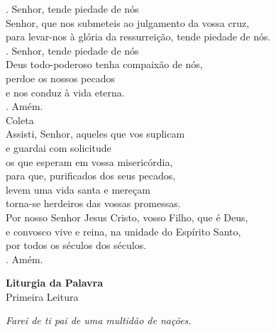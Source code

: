 \documentclass{book}
\begin{document}
\begin{flushleft}
    {\color{VioletRed2} \Rbar.} Senhor, tende piedade de nós
    \vspace{.2cm} \\
    Senhor, que nos submeteis ao julgamento da vossa cruz, \\
    para levar-nos à glória da ressurreição,
    tende piedade de nós. \\
    {\color{VioletRed2} \Rbar.} Senhor, tende piedade de nós
    \vspace{.2cm} \\
    Deus todo-poderoso tenha compaixão de nós, \\
    perdoe os nossos pecados \\
    e nos conduz à vida eterna. \\
    {\color{VioletRed2} \Rbar.} Amém.
    \vspace{.2cm} \\
    \textcolor{VioletRed2}{Coleta}
    \vspace{.2cm} \\
    Assisti, Senhor, aqueles que vos suplicam \\
    e guardai com solicitude \\
    os que esperam em vossa misericórdia, \\
    para que, purificados dos seus pecados, \\
    levem uma vida santa e mereçam  \\
    torna-se herdeiros das vossas promessas. \\
    Por nosso Senhor Jesus Cristo, vosso Filho, que é Deus, \\
    e convosco vive e reina, na unidade do Espírito Santo, \\
    por todos os séculos dos séculos. \\
    {\color{VioletRed2} \Rbar.} Amém. \\
\end{flushleft}
\begin{center}
    \textbf{Liturgia da Palavra}
    \vspace{.2cm}\\
    \textcolor{VioletRed2}{Primeira Leitura}
\end{center}
\begin{flushright}
    \textit{Farei de ti pai de uma multidão de nações.}
\end{flushright}
\end{document}
